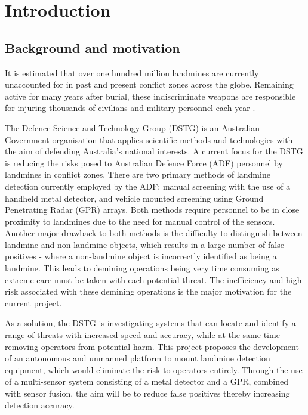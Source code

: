 \documentclass[main.tex]{subfiles}
\begin{document}

\chapter{Introduction}
\section{Background and motivation}

It is estimated that over one hundred million landmines are currently unaccounted for in past and present conflict zones across the globe. Remaining active for many years after burial, these indiscriminate weapons are responsible for injuring thousands of civilians and military personnel each year \parencite{landmineMonitor2015}.

The Defence Science and Technology Group (DSTG) is an Australian Government organisation that applies scientific methods and technologies with the aim of defending Australia's national interests. A current focus for the DSTG is reducing the risks posed to Australian Defence Force (ADF) personnel by landmines in conflict zones. There are two primary methods of landmine detection currently employed by the ADF: manual screening with the use of a handheld metal detector, and vehicle mounted screening using Ground Penetrating Radar (GPR) arrays.
Both methods require personnel to be in close proximity to landmines due to the need for manual control of the sensors. Another major drawback to both methods is the difficulty to distinguish between landmine and non-landmine objects, which results in a large number of false positives - where a non-landmine object is incorrectly identified as being a landmine. This leads to demining operations being very time consuming as extreme care must be taken with each potential threat. The inefficiency and high risk associated with these demining operations is the major motivation for the current project. 

As a solution, the DSTG is investigating systems that can locate and identify a range of threats with increased speed and accuracy, while at the same time removing operators from potential harm. This project proposes the development of an autonomous and unmanned platform to mount landmine detection equipment, which would eliminate the risk to operators entirely. Through the use of a multi-sensor system consisting of a metal detector and a GPR, combined with sensor fusion, the aim will be to reduce false positives thereby increasing detection accuracy.
\end{document}
